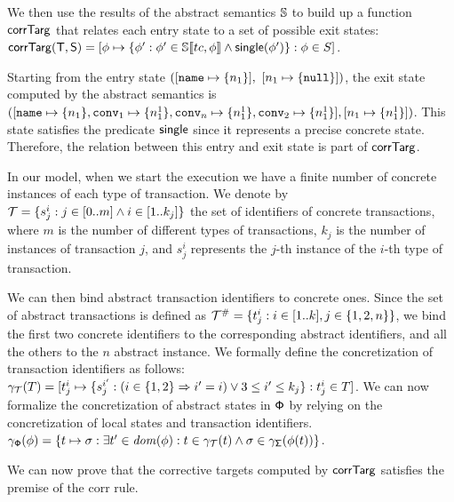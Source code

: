 We then use the results of the abstract semantics $\mathbb{S}$ to build up a function 
$\mathsf{corrTarg}$
that relates each entry state to a set of possible exit states:
\footnotesize
$
\mathsf{corrTarg}(\mathsf{T}, \mathsf{S}) =[\phi \mapsto \{ \phi': \phi' \in \mathbb{S}\llbracket tc, \phi \rrbracket \land
\mathsf{single}(\phi')\} : \phi \in S]
$.
\normalsize

\runex
Starting from the entry state $([\mathtt{name} \mapsto \{n_1\}],$ $[n_1 \mapsto \{\mathtt{null}\}])$, the exit state computed by the abstract semantics is
$([\mathtt{name} \mapsto \{n_1\}, \mathtt{conv}_1 \mapsto \{n^1_1\}, \mathtt{conv}_n \mapsto \{n^1_1\}, \mathtt{conv}_2 \mapsto \{n^1_1\}], [n_1 \mapsto \{n^1_1\}])$. This state satisfies the predicate $\mathsf{single}$ since it represents a precise concrete state. Therefore, the relation between this entry and exit state is part of $\mathsf{corrTarg}$.
	
In our model, when we start the execution we have a finite number of concrete instances of each type of transaction. We denote by ${\cal T} = \{s^i_j : j \in [0..m] \land i \in [1..k_j]\}$ the set of identifiers of concrete transactions, where $m$ is the number of different types of transactions, $k_j$ is the number of instances of transaction $j$, and $s^i_j$ represents the $j$-th instance of the $i$-th type of transaction.

We can then bind abstract transaction identifiers to concrete ones. Since the set of abstract transactions is defined as ${\cal T}^\# = \{t^i_j : i \in [1..k], j \in \{1, 2, n\}\}$, we bind the first two concrete identifiers to the corresponding abstract identifiers, and all the others to the $n$ abstract instance. We formally define the concretization of transaction identifiers as follows:
$
\gamma_{{\cal T}}(T) =
[
t^i_j \mapsto 
\{
s^{i'}_j : (i \in \{1, 2\} \Rightarrow i'=i) \lor 3\leq i' \leq k_j
\} : t^i_j \in T
]
$.
We can now formalize the concretization of abstract states in $\mathsf{\mathsf{\Phi}}$ by relying on the concretization of local states and transaction identifiers.
%
$
\gamma_{\mathsf{\Phi}}(\phi) = \{t \mapsto \sigma : \exists t' \in \mathit{dom}(\phi) : t \in \gamma_{{\cal T}}(t) \land \sigma \in \gamma_{\mathsf{\Sigma}}(\phi(t))\}
$.
\normalsize

We can now prove that the corrective targets computed by $\mathsf{corrTarg}$ satisfies the premise of the {\sf corr} rule.


